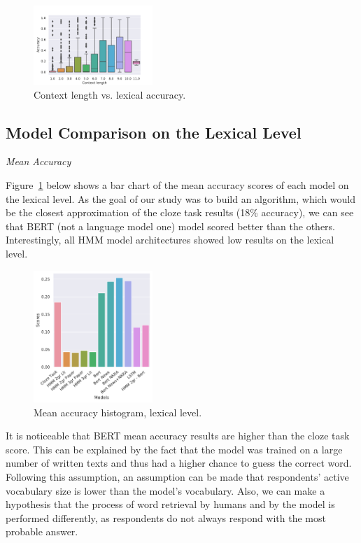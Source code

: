 \documentclass[a4paper]{article}
\newcommand{\head}[1]{\vspace{0.5em}\emph{#1}\vspace{0.25em}}
\begin{document}
\begin{figure}
\centering
\includegraphics[width=0.4\textwidth]{figures/pdf/context-accuracy-lexical.pdf}
\caption{Context length vs. lexical accuracy.}
\end{figure}

\subsection{Model Comparison on the Lexical Level}

\head{Mean Accuracy}

Figure~\ref{fig:mean-accuracy-hist-lex} below shows a bar chart of the mean accuracy scores of each model on
the lexical level. As the goal of our study was to build an algorithm,
which would be the closest approximation of the cloze task results
(18\% accuracy), we can see that BERT (not a language model one) model
scored better than the others. Interestingly, all HMM model
architectures showed low results on the lexical level.

\begin{figure}
\caption{Mean accuracy histogram, lexical level.}
\label{fig:mean-accuracy-hist-lex}
\centering
\includegraphics[width=0.4\textwidth]{figures/pdf/mean-accuracy-hist-lex.pdf}
\end{figure}

It is noticeable that BERT mean accuracy results are higher than the cloze task score. This can be explained by the fact that the model was trained on a large number of written texts and thus had a higher chance to guess the correct word. Following this assumption, an assumption can be made that respondents’ active vocabulary size is lower than the model’s vocabulary. Also, we can make a hypothesis that the process of word retrieval by humans and by the model is performed differently, as respondents do not always respond with the most probable answer.
\end{document}
